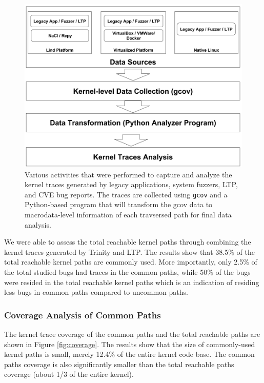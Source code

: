 \begin{figure}%
\centering
\includegraphics[width=1.0\columnwidth]{diagram/data_collection.png}
\caption{Various activities that were performed to capture and analyze the kernel
 traces generated by legacy applications, system fuzzers, LTP, and CVE bug
 reports. The traces are collected using \texttt{gcov} and a Python-based program that will transform the gcov data to 
 macrodata-level information of each travsersed path for final data analysis.}

\label{fig:datacollection}
\end{figure}

We were able to assess the total reachable kernel paths through combining the kernel traces generated by Trinity and LTP. 
The results show that 38.5\% of the total reachable
kernel paths are commonly used. More importantly, only 2.5\% of the total studied bugs had traces in the common paths, 
while 50\% of the bugs were resided in the total reachable kernel paths which is an indication of residing less bugs in common paths compared to uncommon paths.
 

\subsubsection{Coverage Analysis of Common Paths}

The kernel trace coverage of the common paths and the total reachable paths
are shown in Figure \ref{fig:coverage}. The results show that the size of commonly-used kernel paths is small,
merely 12.4\% of the entire kernel code base. The common paths coverage is also significantly smaller than 
the total reachable paths coverage (about 1/3 of the entire kernel).

